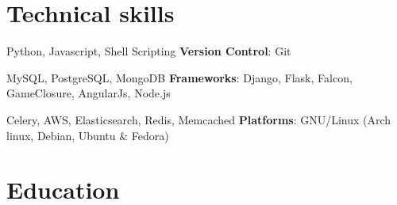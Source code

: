 \documentclass[11pt,a4paper]{moderncv}
\begin{document}
\maketitle

\section{Technical skills}
           {Python, Javascript, Shell Scripting}
           {\textbf{Version Control}: }
           {Git}

           {MySQL, PostgreSQL, MongoDB}
           {\textbf{Frameworks}: }
           {Django, Flask, Falcon, GameClosure, AngularJs, Node.js}

           {Celery, AWS, Elasticsearch, Redis, Memcached}
           {\textbf{Platforms}: }
           {GNU/Linux (Arch linux, Debian, Ubuntu \& Fedora)}

\section{Education}
\end{document}
